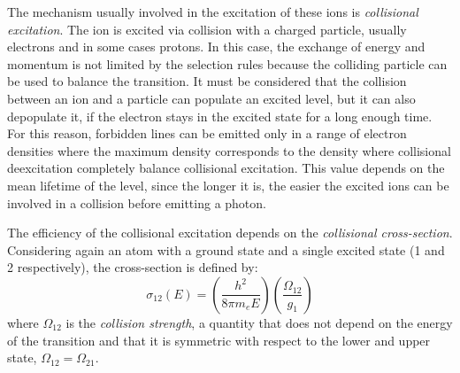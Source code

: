 \documentclass[../main.tex]{subfiles}
\begin{document}
The mechanism usually involved in the excitation of these ions is \emph{collisional excitation}.
The ion is excited via collision with a charged particle, usually electrons and in some cases protons.
In this case, the exchange of energy and momentum is not limited by the selection rules because the colliding particle can be used to balance the transition.
It must be considered that the collision between an ion and a particle can populate an excited level, but it can also depopulate it, if the electron stays in the excited state for a long enough time.
For this reason, forbidden lines can be emitted only in a range of electron densities where the maximum density corresponds to the density where collisional deexcitation completely balance collisional excitation.
This value depends on the mean lifetime of the level, since the longer it is, the easier the excited ions can be involved in a collision before emitting a photon.

The efficiency of the collisional excitation depends on the \emph{collisional cross-section}.
Considering again an atom with a ground state and a single excited state (1 and 2 respectively), the cross-section is defined by:
\begin{equation}
    \label{eq:crosssection}
    \sigma_{12}(E) = \left(\frac{h^2}{8\pi m_e E}\right)\left(\frac{\Omega_{12}}{g_1}\right)
\end{equation}
where $\Omega_{12}$ is the \emph{collision strength}, a quantity that does not depend on the energy of the transition and that it is symmetric with respect to the lower and upper state, $\Omega_{12} = \Omega_{21}$.
\end{document}
